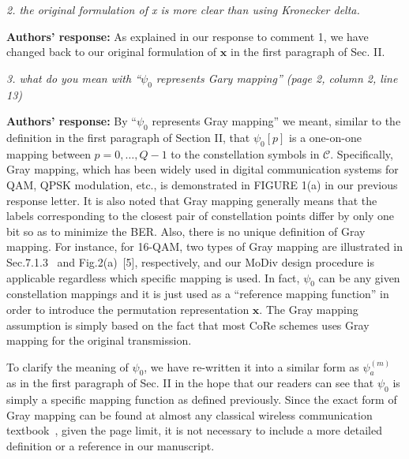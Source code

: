 \documentclass[onecolumn, 11pt, draftclsnofoot]{IEEEtran}
\begin{document}
\vspace{0.5cm}

\noindent
\emph{2. the original formulation of x is more clear than using Kronecker delta.
}

\noindent \textbf{Authors' response:}
As explained in our response to comment 1, we have changed back to our original
formulation of $\mathbf{x}$ in the first paragraph of Sec. II.

\vspace{0.5cm}

\noindent
\emph{3. what do you mean with ``$\psi_0$ represents Gary mapping'' (page 2,
column 2, line 13)}

\noindent \textbf{Authors' response:}
By ``$\psi_0$ represents Gray mapping'' we meant, similar to the definition in
the first paragraph of Section II, that $\psi_0[p]$ is a one-on-one mapping
between $p=0,\ldots,Q-1$ to the constellation symbols in $\mathcal{C}$.
Specifically, Gray mapping, which has been widely used in digital
communication systems for QAM, QPSK modulation, etc., is demonstrated in FIGURE
1(a) in our previous response letter. It is also noted that Gray mapping
generally means that the labels corresponding to the closest pair of
constellation points differ by only one bit so as to minimize the BER. Also,
there is no unique definition of Gray mapping. For instance, for 16-QAM, two
types of Gray mapping are illustrated in Sec.7.1.3~\citep[R][]{TS36.211} and
Fig.2(a)~[5], respectively, and our MoDiv design procedure is applicable
regardless which specific mapping is used. In fact, $\psi_0$ can be any given
constellation mappings and it is just used as a ``reference mapping function''
in order to introduce the permutation representation $\mathbf{x}$.
The Gray mapping assumption is simply based on the fact that most CoRe schemes
uses Gray mapping for the original transmission.

To clarify the meaning of $\psi_0$, we have re-written it into a similar form as
$\psi_a^{(m)}$ as in the first paragraph of Sec. II in the hope that our readers
can see that $\psi_0$ is simply a specific mapping function as defined
previously.
Since the exact form of Gray mapping can be found at almost any classical
wireless communication
textbook~\citep[R][]{proakisdigital,molisch2007wireless,goldsmith2005wireless},
given the page limit, it is not necessary to include a more detailed
definition or a reference in our manuscript.
\end{document}
